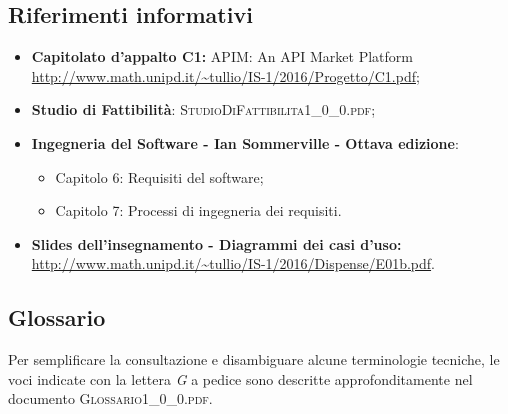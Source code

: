 \subsection{Riferimenti informativi}
\begin{itemize}
	\item \textbf{Capitolato d’appalto C1:} APIM: An API Market Platform\\ \url{http://www.math.unipd.it/~tullio/IS-1/2016/Progetto/C1.pdf};
	\item 	
	\textbf{Studio di Fattibilità}: \textsc{StudioDiFattibilita1\_0\_0.pdf};
	\item
	\textbf{Ingegneria del Software - Ian Sommerville - Ottava edizione}:
	\begin{itemize}
		\item Capitolo 6: Requisiti del software;
		\item Capitolo 7: Processi di ingegneria dei requisiti.
	\end{itemize} 
	\item
	\textbf{Slides dell'insegnamento - Diagrammi dei casi d'uso:}\\ \url{http://www.math.unipd.it/~tullio/IS-1/2016/Dispense/E01b.pdf}.
\end{itemize}

\subsection{Glossario}
Per semplificare la consultazione e disambiguare alcune terminologie tecniche, le voci indicate con la lettera \textit{G} a pedice sono descritte approfonditamente nel documento \textsc{Glossario1\_0\_0.pdf}.